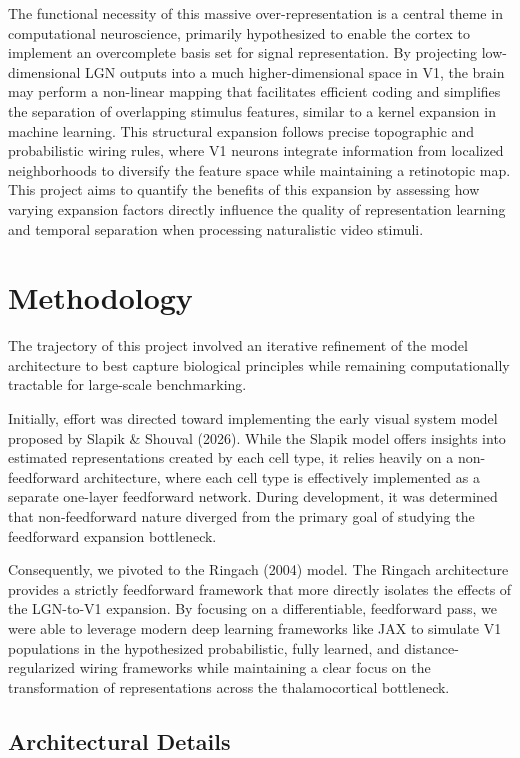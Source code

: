 \documentclass[10pt]{article}
\begin{document}
The functional necessity of this massive over-representation is a central theme in computational neuroscience, primarily hypothesized to enable the cortex to implement 
an overcomplete basis set for signal representation. By projecting low-dimensional LGN outputs into a much higher-dimensional space in V1, the brain may perform a 
non-linear mapping that facilitates efficient coding and simplifies the separation of overlapping stimulus features, similar to a kernel expansion in machine learning. 
This structural expansion follows precise topographic and probabilistic wiring rules, where V1 neurons integrate information from localized neighborhoods to diversify 
the feature space while maintaining a retinotopic map. This project aims to quantify the benefits of this expansion by assessing how varying expansion factors directly 
influence the quality of representation learning and temporal separation when processing naturalistic video stimuli.

\section{Methodology}

The trajectory of this project involved an iterative refinement of the model architecture to best capture biological principles while remaining computationally tractable 
for large-scale benchmarking. 

Initially, effort was directed toward implementing the early visual system model proposed by Slapik \& Shouval (2026). While the Slapik model offers insights 
into estimated representations created by each cell type, it relies heavily on a non-feedforward architecture, where each cell type is effectively implemented as a separate 
one-layer feedforward network. During development, it was determined that non-feedforward nature diverged from the primary goal of studying the feedforward expansion bottleneck.  

Consequently, we pivoted to the Ringach (2004) model. The Ringach architecture provides a strictly feedforward framework that more directly isolates the effects of the LGN-to-V1 
expansion. By focusing on a differentiable, feedforward pass, we were able to leverage modern deep learning frameworks like JAX to simulate V1 populations 
in the hypothesized probabilistic, fully learned, and distance-regularized wiring frameworks while maintaining a clear focus on the transformation of representations 
across the thalamocortical bottleneck.

\subsection{Architectural Details}
\end{document}
